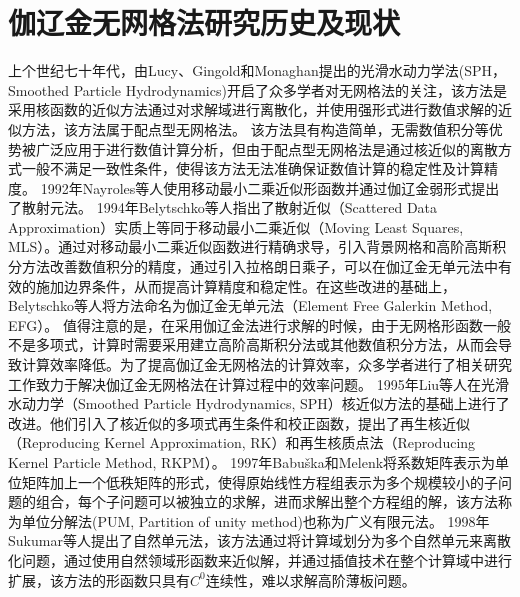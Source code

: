 \section{伽辽金无网格法研究历史及现状}
上个世纪七十年代，由Lucy\textsuperscript{\cite{1977A}}、Gingold和Monaghan\textsuperscript{\cite{gingold1977}}提出的光滑水动力学法(SPH，Smoothed Particle Hydrodynamics)开启了众多学者对无网格法的关注，该方法是采用核函数的近似方法通过对求解域进行离散化，并使用强形式进行数值求解的近似方法，该方法属于配点型无网格法。
该方法具有构造简单，无需数值积分等优势被广泛应用于进行数值计算分析，但由于配点型无网格法是通过核近似的离散方式一般不满足一致性条件，使得该方法无法准确保证数值计算的稳定性及计算精度\textsuperscript{\cite{auricchio2010a,wang2018a,wang2020,gomez2016}}。
1992年Nayroles等人\textsuperscript{\cite{nayroles1992}}使用移动最小二乘近似形函数并通过伽辽金弱形式提出了散射元法。
1994年Belytschko等人\textsuperscript{\cite{belytschko1994}}指出了散射近似（Scattered Data Approximation）实质上等同于移动最小二乘近似（Moving Least Squares, MLS）。通过对移动最小二乘近似函数进行精确求导，引入背景网格和高阶高斯积分方法改善数值积分的精度，通过引入拉格朗日乘子，可以在伽辽金无单元法中有效的施加边界条件，从而提高计算精度和稳定性。在这些改进的基础上，Belytschko等人将方法命名为伽辽金无单元法（Element Free Galerkin Method, EFG）。
值得注意的是，在采用伽辽金法进行求解的时候，由于无网格形函数一般不是多项式，计算时需要采用建立高阶高斯积分法或其他数值积分方法\textsuperscript{\cite{de2001,carpinteri2002,WangBingBing2019}}，从而会导致计算效率降低\textsuperscript{\cite{melenk1996,WuJunChao2016}}。为了提高伽辽金无网格法的计算效率，众多学者进行了相关研究工作致力于解决伽辽金无网格法在计算过程中的效率问题\textsuperscript{\cite{wang2016,wang2019,chen2001,chen2013,duan2012,duan2014}}。
1995年Liu等人\textsuperscript{\cite{liu1995}}在光滑水动力学（Smoothed Particle Hydrodynamics, SPH）核近似方法的基础上进行了改进。他们引入了核近似的多项式再生条件和校正函数，提出了再生核近似（Reproducing Kernel Approximation, RK）和再生核质点法（Reproducing Kernel Particle Method, RKPM）。
1997年Babuška和Melenk\textsuperscript{\cite{melenk1996,babuska1997}}将系数矩阵表示为单位矩阵加上一个低秩矩阵的形式，使得原始线性方程组表示为多个规模较小的子问题的组合，每个子问题可以被独立的求解，进而求解出整个方程组的解，该方法称为单位分解法(PUM, Partition of unity method)也称为广义有限元法\textsuperscript{\cite{strouboulis2001}}。
1998年Sukumar等人\textsuperscript{\cite{sukumar1998}}提出了自然单元法，该方法通过将计算域划分为多个自然单元来离散化问题，通过使用自然领域形函数来近似解，并通过插值技术在整个计算域中进行扩展，该方法的形函数只具有$C^0$连续性，难以求解高阶薄板问题。
